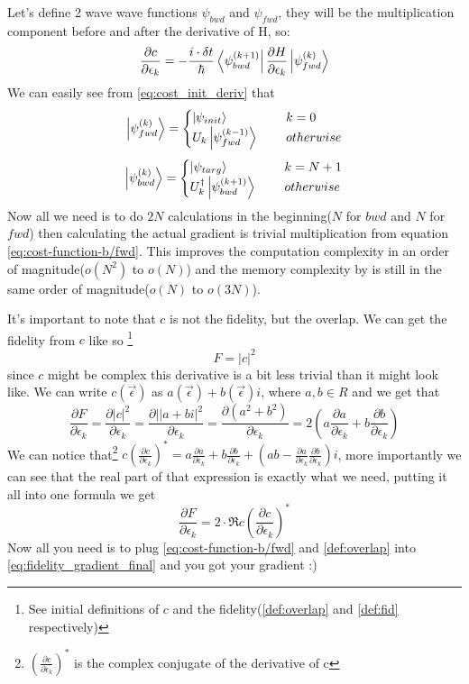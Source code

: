 \documentclass[english, a4paper, 12pt, twoside]{article}
\numberwithin{equation}{section} %
\begin{document}
Let's define 2 wave wave functions $\psi_{bwd}$ and $\psi_{fwd}$, they will be the multiplication component before and after the derivative of H, so:
\begin{equation} \label{eq:cost-function-b/fwd}
    \frac{\partial c}{\partial \epsilon_k} =  -\frac{i\cdot \delta t}{\hbar}\bra{\psi_{bwd}^{(k+1)}} \frac{\partial H}{\partial \epsilon_k} \ket{\psi_{fwd}^{(k)}}
\end{equation}
We can easily see from \ref{eq:cost_init_deriv} that 
\[   
\ket{\psi_{fwd}^{(k)}} = 
     \begin{cases}
       \ket{\psi_{init}} &\quad\ k=0\\
       U_k \ket{\psi_{fwd}^{(k-1)}} &\quad\ otherwise\\
     \end{cases}
\]
\[   
\ket{\psi_{bwd}^{(k)}} = 
     \begin{cases}
       \ket{\psi_{targ}} &\quad\ k=N+1\\
       U_k^{\dag{}} \ket{\psi_{bwd}^{(k+1)}} &\quad\ otherwise\\
     \end{cases}
\]
Now all we need is to do $2N$ calculations in the beginning($N$ for $bwd$ and $N$ for $fwd$) then calculating the actual gradient is trivial multiplication from equation \ref{eq:cost-function-b/fwd}. This improves the computation complexity in an order of magnitude($o(N^2)$ to $o(N)$) and the memory complexity by is still in the same order of magnitude($o(N)$ to $o(3N)$).

It's important to note that $c$ is not the fidelity, but the overlap. We can get the fidelity from $c$ like so \footnote{See initial definitions of $c$ and the fidelity(\ref{def:overlap} and \ref{def:fid} respectively)}
\[
F = |c|^2
\]
since $c$ might be complex this derivative is a bit less trivial than it might look like. We can write $c(\vec{\epsilon})$ as $a(\vec{\epsilon}) + b(\vec{\epsilon})i$, where $a, b \in R$ and we get that 
\[
\frac{\partial F}{\partial \epsilon_k} = \frac{\partial |c|^2}{\partial \epsilon_k} = \frac{\partial ||a+bi|^2}{\partial \epsilon_k} = \frac{\partial (a^2 + b^2)}{\partial \epsilon_k} = 2(a\frac{\partial a}{\partial \epsilon_k} + b\frac{\partial b}{\partial \epsilon_k})
\]
We can notice that\footnote{$(\frac{\partial c}{\partial \epsilon_k})^*$ is the complex conjugate of the derivative of c} $c(\frac{\partial c}{\partial \epsilon_k})^* = a\frac{\partial a}{\partial \epsilon_k} + b\frac{\partial b}{\partial \epsilon_k} + (ab - \frac{\partial a}{\partial \epsilon_k}\frac{\partial b}{\partial \epsilon_k})i$, more importantly we can see that the real part of that expression is exactly what we need, putting it all into one formula we get
\begin{equation} \label{eq:fidelity_gradient_final}
    \frac{\partial F}{\partial \epsilon_k} = 2\cdot \Re{c(\frac{\partial c}{\partial \epsilon_k})^*}
\end{equation}
Now all you need is to plug \ref{eq:cost-function-b/fwd} and \ref{def:overlap} into \ref{eq:fidelity_gradient_final} and you got your gradient :)
\end{document}
